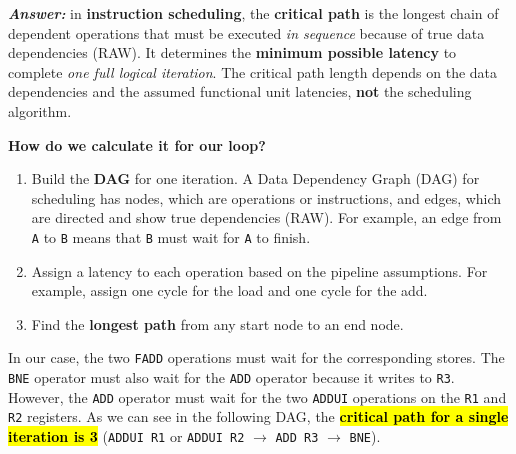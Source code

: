\begin{enumerate}
    \textcolor{Green3}{\textbf{\emph{Answer:}}} in \textbf{instruction scheduling}, the \textbf{critical path} is the longest chain of dependent operations that must be executed \emph{in sequence} because of true data dependencies (RAW). It determines the \textbf{minimum possible latency} to complete \emph{one full logical iteration}. The critical path length depends on the data dependencies and the assumed functional unit latencies, \textbf{not} the scheduling algorithm.

    \textcolor{Green3}{ \textbf{How do we calculate it for our loop?}}
    \begin{enumerate}
        \item Build the \textbf{DAG} for one iteration. A Data Dependency Graph (DAG) for scheduling has nodes, which are operations or instructions, and edges, which are directed and show true dependencies (RAW). For example, an edge from \texttt{A} to \texttt{B} means that \texttt{B} must wait for \texttt{A} to finish.
        \item Assign a latency to each operation based on the pipeline assumptions. For example, assign one cycle for the load and one cycle for the add.
        \item Find the \textbf{longest path} from any start node to an end node.
    \end{enumerate}
    In our case, the two \texttt{FADD} operations must wait for the corresponding stores. The \texttt{BNE} operator must also wait for the \texttt{ADD} operator because it writes to \texttt{R3}. However, the \texttt{ADD} operator must wait for the two \texttt{ADDUI} operations on the \texttt{R1} and \texttt{R2} registers. As we can see in the following DAG, the \hl{\textbf{critical path for a single iteration is 3}} (\texttt{ADDUI R1} or \texttt{ADDUI R2} $\rightarrow$ \texttt{ADD R3} $\rightarrow$ \texttt{BNE}).
    \begin{center}
\end{center}
\end{enumerate}
